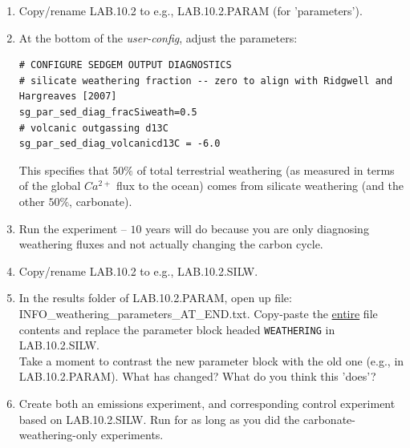 \begin{enumerate}[noitemsep]

\vspace{1mm}
\item Copy/rename \textsf{\footnotesize LAB.10.2} to e.g., \textsf{\footnotesize LAB.10.2.PARAM} (for 'parameters').

\vspace{1mm}
\item At the bottom of the \textit{user-config}, adjust the parameters:
\vspace{-0mm}\small\begin{verbatim}
# CONFIGURE SEDGEM OUTPUT DIAGNOSTICS
# silicate weathering fraction -- zero to align with Ridgwell and Hargreaves [2007]
sg_par_sed_diag_fracSiweath=0.5
# volcanic outgassing d13C
sg_par_sed_diag_volcanicd13C = -6.0
\end{verbatim}\normalsize\vspace{-0mm}
This specifies that $50\%$ of total terrestrial weathering (as measured in terms of the global $Ca^{2+}$ flux to the ocean) comes from silicate weathering (and the other $50\%$, carbonate).

\vspace{1mm}
\item Run the experiment -- $10$ years will do because you are only diagnosing weathering fluxes and not actually changing the carbon cycle.

\vspace{1mm}
\item Copy/rename \textsf{\footnotesize LAB.10.2} to e.g., \textsf{\footnotesize LAB.10.2.SILW}.

\vspace{1mm}
\item In the \textsf{\footnotesize results} folder of \textsf{\footnotesize LAB.10.2.PARAM}, open up file: \textsf{\footnotesize INFO\_weathering\_parameters\_AT\_END.txt}. Copy-paste the \uline{entire} file contents and replace the parameter block headed \texttt{\footnotesize WEATHERING} in \textsf{\footnotesize LAB.10.2.SILW}.
\\Take a moment to contrast the new parameter block with the old one (e.g., in \textsf{\footnotesize LAB.10.2.PARAM}). What has changed? What do you think this 'does'? 

\vspace{1mm}
\item Create both an emissions experiment, and corresponding control experiment based on \textsf{\footnotesize LAB.10.2.SILW}. Run for as long as you did the carbonate-weathering-only experiments.

\end{enumerate}

